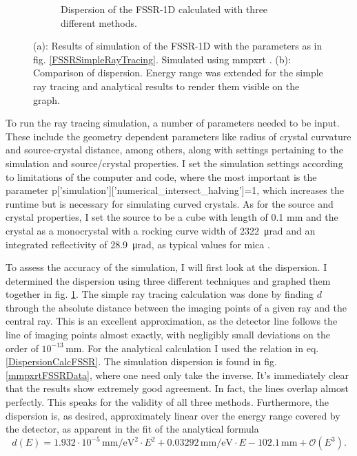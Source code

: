 \begin{figure} [H]
\begin{subfigure}[t]{0.68\textwidth}
		\caption{Dispersion of the FSSR-1D calculated 
		with three 
		different methods.}
		\label{DispComparisonFSSR}
	\end{subfigure}%
	\caption{(a): Results of simulation of 
	the FSSR-1D with the parameters as in 
	fig. \ref{FSSRSimpleRayTracing}. Simulated using 
	mmpxrt \citep{vsmid2021x}. (b): Comparison of 
	dispersion. Energy range was extended for the 
	simple ray tracing and analytical results to 
	render them visible on the graph. }
	\label{mmpxrtFSSR}
\end{figure}

To run the ray tracing simulation, a number of parameters needed 
to be input. 
These include the geometry dependent parameters like radius of 
crystal 
curvature and source-crystal distance, among others, along with 
settings 
pertaining to the simulation and source/crystal 
properties. I set the simulation settings according 
to limitations 
of the computer 
and code, where the most important is the parameter 
p['simulation']['numerical\_intersect\_halving']=1, which 
increases the runtime 
but is necessary for simulating curved crystals. As for the 
source and crystal 
properties, I set the source to be a cube with length of 0.1 
\unit{mm} and the 
crystal as a monocrystal with a rocking curve width of 
\SI{2322}{\micro\radian}
and an integrated reflectivity of 
\SI{28.9}{\micro\radian}, as typical values for mica
\citep{holzer1998flat}.



To assess the accuracy of the simulation, I will first 
look at the dispersion. I determined the dispersion using three 
different 
techniques and graphed them together in fig. 
\ref{DispComparisonFSSR}. The 
simple ray tracing calculation was done by finding $d$ through 
the absolute 
distance between the imaging points of a given ray and the 
central ray. This is 
an excellent approximation, as the detector line 
follows the line of 
imaging points 
almost exactly, with negligibly small deviations on 
the order of 
$10^{-13}$\,\si{\milli\meter}. 
For the analytical calculation I used the relation in eq. 
\ref{DispersionCalcFSSR}. The simulation dispersion is found in 
fig. 
\ref{mmpxrtFSSRData}, where one need only take the 
inverse. It's 
immediately clear 
that the results show extremely good agreement. In fact, the 
lines overlap 
almost perfectly. This speaks for the validity of all three 
methods. 
Furthermore, the dispersion is, as desired, approximately 
linear over the energy range covered by the detector, 
as apparent 
in the fit of the analytical formula 
\begin{equation}
d(E) = 1.932\cdot 
10^{-5}\,\si{\milli\meter\per\electronvolt\squared} \cdot E^2 
+ 0.03292\,\si{\milli\meter\per\electronvolt} \cdot E - 102.1 
\,\si{\milli\meter} + \mathcal{O}(E^3).
\end{equation}

